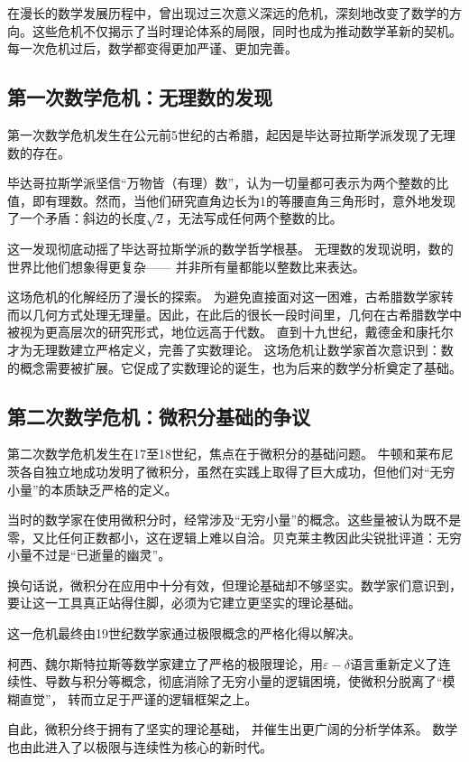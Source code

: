 在漫长的数学发展历程中，曾出现过三次意义深远的危机，深刻地改变了数学的方向。这些危机不仅揭示了当时理论体系的局限，同时也成为推动数学革新的契机。每一次危机过后，数学都变得更加严谨、更加完善。

\subsection{第一次数学危机：无理数的发现}

第一次数学危机发生在公元前5世纪的古希腊，起因是毕达哥拉斯学派发现了无理数的存在。

毕达哥拉斯学派坚信“万物皆（有理）数”，认为一切量都可表示为两个整数的比值，即有理数。然而，当他们研究直角边长为1的等腰直角三角形时，意外地发现了一个矛盾：斜边的长度$\sqrt{2}$，无法写成任何两个整数的比。  

这一发现彻底动摇了毕达哥拉斯学派的数学哲学根基。  
无理数的发现说明，数的世界比他们想象得更复杂——  
并非所有量都能以整数比来表达。

这场危机的化解经历了漫长的探索。  
为避免直接面对这一困难，古希腊数学家转而以几何方式处理无理量。因此，在此后的很长一段时间里，几何在古希腊数学中被视为更高层次的研究形式，地位远高于代数。
直到十九世纪，戴德金和康托尔才为无理数建立严格定义，完善了实数理论。
这场危机让数学家首次意识到：数的概念需要被扩展。它促成了实数理论的诞生，也为后来的数学分析奠定了基础。

\subsection{第二次数学危机：微积分基础的争议}

第二次数学危机发生在17至18世纪，焦点在于微积分的基础问题。
牛顿和莱布尼茨各自独立地成功发明了微积分，虽然在实践上取得了巨大成功，但他们对“无穷小量”的本质缺乏严格的定义。

当时的数学家在使用微积分时，经常涉及“无穷小量”的概念。这些量被认为既不是零，又比任何正数都小，这在逻辑上难以自洽。贝克莱主教因此尖锐批评道：无穷小量不过是“已逝量的幽灵”。 

换句话说，微积分在应用中十分有效，但理论基础却不够坚实。数学家们意识到，要让这一工具真正站得住脚，必须为它建立更坚实的理论基础。

这一危机最终由19世纪数学家通过极限概念的严格化得以解决。

柯西、魏尔斯特拉斯等数学家建立了严格的极限理论，用$\varepsilon-\delta$语言重新定义了连续性、导数与积分等概念，彻底消除了无穷小量的逻辑困境，使微积分脱离了“模糊直觉”，  转而立足于严谨的逻辑框架之上。

自此，微积分终于拥有了坚实的理论基础，  
并催生出更广阔的分析学体系。  
数学也由此进入了以极限与连续性为核心的新时代。  

